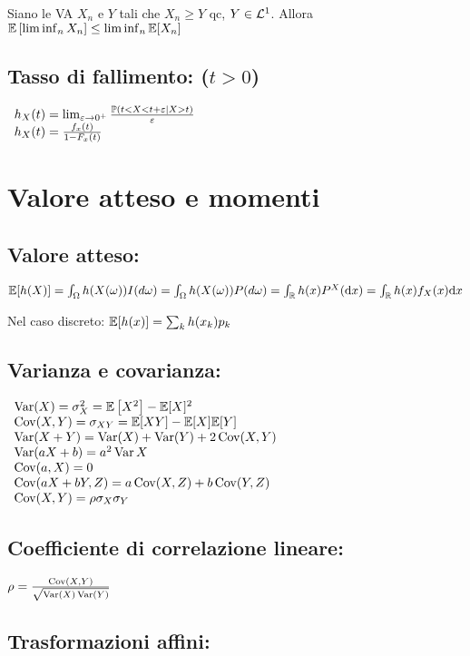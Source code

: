 Siano le VA $X_n$ e $Y$ tali che $X_n \geq Y$ qc, $Y\in \mathcal L^1$. Allora $\mathbb E\left[\liminf_n X_n\right] \leq \liminf_n\mathbb E[ X_n]$
\subsection{Tasso di fallimento: ($t >0$)}

$ \begin{array}{l}
h_X (t)=\lim_{\varepsilon \rightarrow 0^+}\frac{\mathbb P (t< X< t+\varepsilon |X >t)}{\varepsilon}\\
h_X (t)=\frac{f_x (t)}{1-F_x (t)}
\end{array}$
\section{Valore atteso e momenti}
\subsection{Valore atteso:}

$\mathbb E[h(X)]=\int_{\Omega} h(X(\omega ))I(d\omega )=\int_{\Omega} h(X(\omega ))P(d\omega )=\int_{\mathbb R} h(x)P^X (\mathrm d x)=\int_{\mathbb R} h(x)f_X (x)\mathrm d x$

Nel caso discreto: $\mathbb E[h(x)]=\sum_k h( x_k) p_k$
\subsection{Varianza e covarianza:}

$ \begin{array}{l}
\operatorname{Var}(X)=\sigma^2_X =\mathbb E\left[ X^2\right] -\mathbb E[X]^2\\
\operatorname{Cov}(X,Y)=\sigma_{XY} =\mathbb E[XY]-\mathbb E[X]\mathbb E[Y]\\
\operatorname{Var}(X+Y)=\operatorname{Var}(X)+\operatorname{Var}(Y)+2\operatorname{Cov}(X,Y)\\
\operatorname{Var}(aX+b) =a^2\operatorname{Var} X\\
\operatorname{Cov}(a,X) =0\\
\operatorname{Cov}(aX+bY,Z) =a\operatorname{Cov}(X,Z) +b\operatorname{Cov}(Y,Z)\\
\operatorname{Cov}(X,Y) =\rho \sigma_X \sigma_Y
\end{array}$
\subsection{Coefficiente di correlazione lineare:}

$\rho =\frac{\operatorname{Cov}(X,Y)}{\sqrt{\operatorname{Var}(X)\operatorname{Var}(Y)}}$
\subsection{Trasformazioni affini:}

